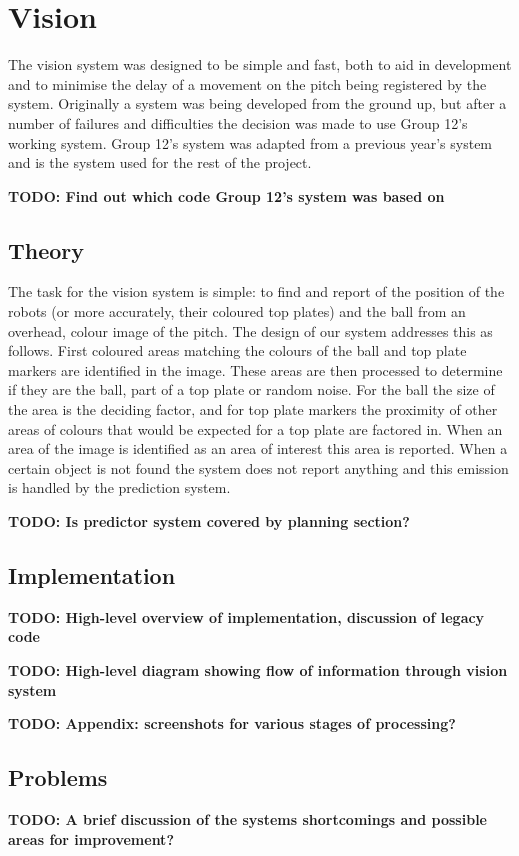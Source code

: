 \newcommand\visiontodo[1]{\textbf{TODO: #1}}

\section{Vision}

The vision system was designed to be simple and fast, both to aid in development and to minimise the delay of a movement on the
pitch being registered by the system. Originally a system was being developed from the ground up, but after a number of failures
and difficulties the decision was made to use Group 12's working system. Group 12's system was adapted from a previous year's
system and is the system used for the rest of the project.

\visiontodo{Find out which code Group 12's system was based on}

\subsection{Theory}

The task for the vision system is simple: to find and report of the position of the robots (or more accurately, their coloured
top plates) and the ball from an overhead, colour image of the pitch. The design of our system addresses this as follows. First
coloured areas matching the colours of the ball and top plate markers are identified in the image. These areas are then processed
to determine if they are the ball, part of a top plate or random noise. For the ball the size of the area is the deciding factor,
and for top plate markers the proximity of other areas of colours that would be expected for a top plate are factored in. When
an area of the image is identified as an area of interest this area is reported. When a certain object is not found the system
does not report anything and this emission is handled by the prediction system.

\visiontodo{Is predictor system covered by planning section?}

\subsection{Implementation}

\visiontodo{High-level overview of implementation, discussion of legacy code}

\visiontodo{High-level diagram showing flow of information through vision system}

\visiontodo{Appendix: screenshots for various stages of processing?}

\subsection{Problems}

\visiontodo{A brief discussion of the systems shortcomings and possible areas for improvement?}
